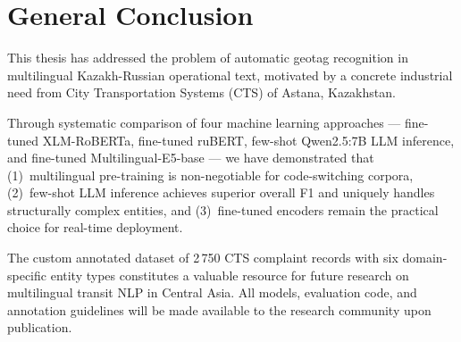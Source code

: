%
%
\chapter{General Conclusion}

This thesis has addressed the problem of automatic geotag recognition in multilingual Kazakh-Russian operational text, motivated by a concrete industrial need from City Transportation Systems (CTS) of Astana, Kazakhstan.

Through systematic comparison of four machine learning approaches --- fine-tuned XLM-RoBERTa, fine-tuned ruBERT, few-shot Qwen2.5:7B LLM inference, and fine-tuned Multilingual-E5-base --- we have demonstrated that (1)~multilingual pre-training is non-negotiable for code-switching corpora, (2)~few-shot LLM inference achieves superior overall F1 and uniquely handles structurally complex entities, and (3)~fine-tuned encoders remain the practical choice for real-time deployment.

The custom annotated dataset of 2\,750 CTS complaint records with six domain-specific entity types constitutes a valuable resource for future research on multilingual transit NLP in Central Asia. All models, evaluation code, and annotation guidelines will be made available to the research community upon publication.
